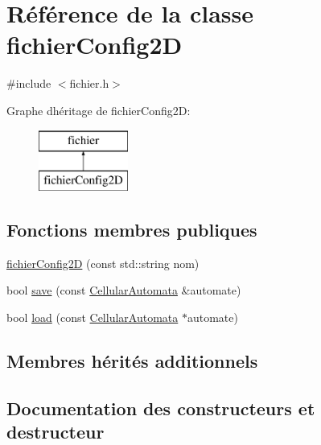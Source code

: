 \hypertarget{classfichier_config2_d}{}\section{Référence de la classe fichier\+Config2D}
\label{classfichier_config2_d}


{\ttfamily \#include $<$fichier.\+h$>$}

Graphe d\textquotesingle{}héritage de fichier\+Config2D\+:\begin{figure}[H]
\begin{center}
\leavevmode
\includegraphics[height=2.000000cm]{classfichier_config2_d}
\end{center}
\end{figure}
\subsection*{Fonctions membres publiques}
\begin{DoxyCompactItemize}
\item 
\mbox{\hyperlink{classfichier_config2_d_a4614bc2c0ab608204eaddc468337d80d}{fichier\+Config2D}} (const std\+::string nom)
\item 
bool \mbox{\hyperlink{classfichier_config2_d_ac91d6cd20fd9edc6ed71684b8d5a1b40}{save}} (const \mbox{\hyperlink{class_cellular_automata}{Cellular\+Automata}} \&automate)
\item 
bool \mbox{\hyperlink{classfichier_config2_d_a90761ac1866815bd59b0f1730ce6bd5f}{load}} (const \mbox{\hyperlink{class_cellular_automata}{Cellular\+Automata}} $\ast$automate)
\end{DoxyCompactItemize}
\subsection*{Membres hérités additionnels}


\subsection{Documentation des constructeurs et destructeur}
\mbox{\label{classfichier_config2_d_a4614bc2c0ab608204eaddc468337d80d}} 
